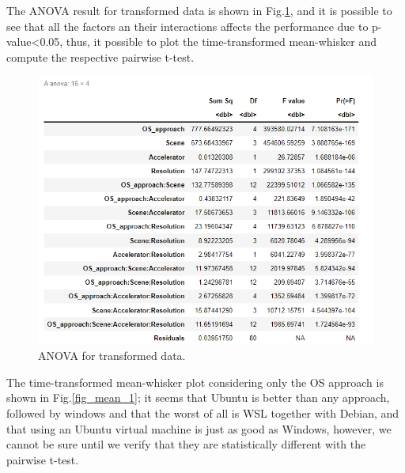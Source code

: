 \documentclass[conference]{IEEEtran}
\begin{document}
The ANOVA result for transformed data is shown in Fig.\ref{fig_anova}, and it is possible to see that all the factors an their interactions affects the performance due to p-value<0.05, thus, it possible to plot the time-transformed mean-whisker and compute the respective pairwise t-test.


\begin{figure}[tb]
    \centering
    \includegraphics[scale=0.5]{figures/anova.png}
    \caption{ANOVA for transformed data.}
    \label{fig_anova}
\end{figure}

The time-transformed mean-whisker plot considering only the OS approach is shown in Fig.\ref{fig_mean_1}; it seems that Ubuntu is better than any approach, followed by windows and that the worst of all is WSL together with Debian, and that using an Ubuntu virtual machine is just as good as Windows, however, we cannot be sure until we verify that they are statistically different with the pairwise t-test.
\end{document}
